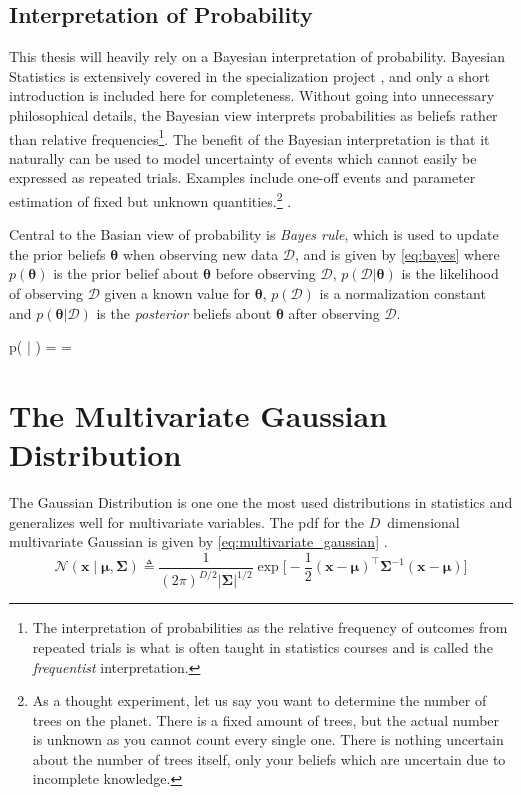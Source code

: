 \subsection{Interpretation of Probability}
This thesis will heavily rely on a Bayesian interpretation of probability. Bayesian Statistics is extensively covered in the specialization project \cite{mellbye}, and only a short introduction is included here for completeness. Without going into unnecessary philosophical details, the Bayesian view interprets probabilities as beliefs rather than relative frequencies\footnote{The interpretation of probabilities as the relative frequency of outcomes from repeated trials is what is often taught in statistics courses and is called the \textit{frequentist} interpretation.}. 
The benefit of the Bayesian interpretation is that it naturally can be used to model uncertainty of events which cannot easily be expressed as repeated trials. Examples include one-off events and parameter estimation of fixed but unknown quantities.\footnote{As a thought experiment, let us say you want to determine the number of trees on the planet. There is a fixed amount of trees, but the actual number is unknown as you cannot count every single one. There is nothing uncertain about the number of trees itself, only your beliefs which are uncertain due to incomplete knowledge.} \cite{murphy}.

Central to the Basian view of probability is \textit{Bayes rule}, which is used to update the prior beliefs $\boldsymbol{\theta}$ when observing new data $\mathcal{D}$, and is given by \cref{eq:bayes} where $p(\boldsymbol{\theta})$ is the prior belief about $\boldsymbol{\theta}$ before observing $\mathcal{D}$, $p(\mathcal{D} | \boldsymbol{\theta})$ is the likelihood of observing $\mathcal{D}$ given a known value for $\boldsymbol{\theta}$, $p(\mathcal{D})$ is a normalization constant and $p(\boldsymbol{\theta} | \mathcal{D})$ is the \textit{posterior} beliefs about $\boldsymbol{\theta}$ after observing $\mathcal{D}$. 

\begin{tcolorbox}[ams equation, title={Bayes Rule}]\label{eq:bayes}
    p(\boldsymbol{\theta} | ) =  = 
\end{tcolorbox}

\section{The Multivariate Gaussian Distribution}
The Gaussian Distribution is one one the most used distributions in statistics \cite{murphy} and generalizes well for multivariate variables. The pdf for the $D$ dimensional multivariate Gaussian is given by \cref{eq:multivariate_gaussian} \cite{murphy,rasmussen}.
\begin{equation}\label{eq:multivariate_gaussian}
    \mathcal{N}(\boldsymbol{x} \; | \; \boldsymbol{\mu}, \boldsymbol{\Sigma}) \triangleq \frac{1}{(2 \pi)^{D/2} |\boldsymbol{\Sigma} | ^{1/2}} \exp \bigg[- \frac{1}{2} (\boldsymbol{x} - \boldsymbol{\mu})^\intercal \boldsymbol{\Sigma}^{-1}(\boldsymbol{x} - \boldsymbol{\mu})\bigg]
\end{equation}

